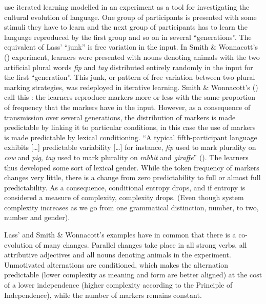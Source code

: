 \documentclass[output=collectionpaper]{langsci/langscibook}
\begin{document}
\cite{Smith2010} use iterated learning modelled in an experiment as a tool for investigating the cultural evolution of language. One group of participants is presented with some stimuli they have to learn and the next group of participants has to learn the language reproduced by the first group and so on in several ``generations''. The equivalent of Lass' ``junk'' is free variation in the input. In Smith \& Wonnacott's (\citeyear*{Smith2010}) experiment, learners were presented with nouns denoting animals with the two artificial plural words \textit{fip} and \textit{tay} distributed entirely randomly in the input for the first ``generation''. This junk, or pattern of free variation between two plural marking strategies, was redeployed in iterative learning. Smith \& Wonnacott's (\citeyear*{Smith2010}) call this : the learners reproduce markers more or less with the same proportion of frequency that the markers have in the input. However, as a consequence of transmission over several generations, the distribution of markers is made predictable by linking it to particular conditions, in this case the use of markers is made predictable by lexical conditioning. ``A typical fifth-participant language exhibits [{\dots}] predictable variability [{\dots}] for instance, \textit{fip} used to mark plurality on \textit{cow} and \textit{pig}, \textit{tay} used to mark plurality on \textit{rabbit} and \textit{giraffe}'' (\citealt[447]{Smith2010}). The learners thus developed some sort of lexical gender. While the token frequency of markers changes very little, there is a change from zero predictability to full or almost full predictability. As a consequence, conditional entropy drops, and if entropy is considered a measure of complexity, complexity drops. (Even though system complexity increases as we go from one grammatical distinction, number, to two, number and gender).

Lass' and Smith \& Wonnacott's examples have in common that there is a co-evolution of many changes. Parallel changes take place in all  strong verbs, all  attributive adjectives and all nouns denoting animals in the experiment. Unmotivated alternations are conditioned, which makes the alternation predictable (lower complexity as meaning and form are better aligned) at the cost of a lower independence (higher complexity according to the Principle of Independence), while the number of markers remains constant.
\end{document}
